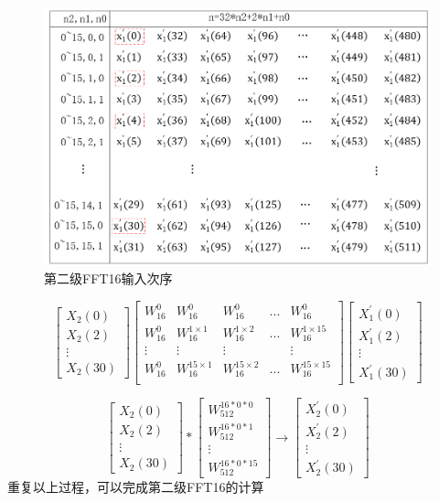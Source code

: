 \documentclass[12pt,a4paper]{article}
\begin{document}
\begin{figure}[h]
\centering
\includegraphics[scale=0.6]{figures/figure2}
\caption{第二级FFT16输入次序}
\end{figure}

\begin{equation}
\begin{bmatrix}
X_2(0) \\ X_2(2) \\ \vdots \\ X_2(30)
\end{bmatrix}
\begin{bmatrix}
W_{16}^0 & W_{16}^0 & W_{16}^0 &... &W_{16}^0 \\
W_{16}^0 & W_{16}^{1\times 1} & W_{16}^{1\times 2} &... &W_{16}^{1\times15} \\
\vdots &\vdots &\vdots &  &\vdots \\
W_{16}^0 & W_{16}^{15\times 1} & W_{16}^{15\times 2} &... &W_{16}^{15\times 15} \\
\end{bmatrix}
\begin{bmatrix}
X_1^{'}(0) \\ X_1^{'}(2) \\ \vdots \\ X_1^{'}(30)
\end{bmatrix}
\end{equation}

\begin{equation}
\begin{bmatrix}
X_2(0) \\ X_2(2) \\ \vdots \\ X_2(30)
\end{bmatrix}
*
\begin{bmatrix}
W_{512}^{16*0*0} \\ W_{512}^{16*0*1} \\ \vdots \\ W_{512}^{16*0*15}
\end{bmatrix}
\rightarrow
\begin{bmatrix}
X_2^{'}(0) \\ X_2^{'}(2) \\ \vdots \\ X_2^{'}(30)
\end{bmatrix}
\end{equation}
\noindent 重复以上过程，可以完成第二级FFT16的计算
\end{document}
